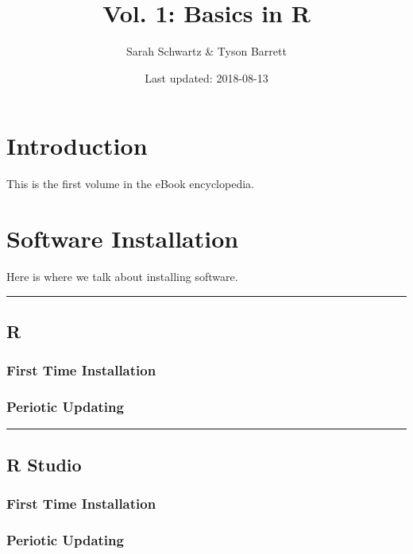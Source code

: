 \documentclass[]{book}
\title{Vol. 1: Basics in R}
\author{Sarah Schwartz \& Tyson Barrett}
\date{Last updated: 2018-08-13}
\begin{document}
\maketitle

{
\setcounter{tocdepth}{1}
\tableofcontents
}
\chapter{Introduction}\label{introduction}

This is the first volume in the eBook encyclopedia.

\chapter{Software Installation}\label{software-installation}

Here is where we talk about installing software.

\begin{center}\rule{0.5\linewidth}{\linethickness}\end{center}

\section{R}\label{r}

\subsection{First Time Installation}\label{first-time-installation}

\subsection{Periotic Updating}\label{periotic-updating}

\begin{center}\rule{0.5\linewidth}{\linethickness}\end{center}

\section{R Studio}\label{r-studio}

\subsection{First Time Installation}\label{first-time-installation-1}

\subsection{Periotic Updating}\label{periotic-updating-1}
\end{document}
